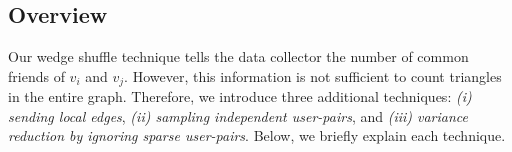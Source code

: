 \subsection{Overview}
\label{sub:triangle_overview}
Our wedge shuffle technique tells the data collector the number of common friends of $v_i$ and $v_j$. 
However, this information is not sufficient to count triangles in the entire graph. 
Therefore, we introduce 
three additional techniques: 
\textit{(i) sending local edges}, 
\textit{(ii) sampling independent user-pairs}, 
and 
\textit{(iii) variance reduction by ignoring sparse user-pairs}. 
Below, we briefly explain each technique. 

